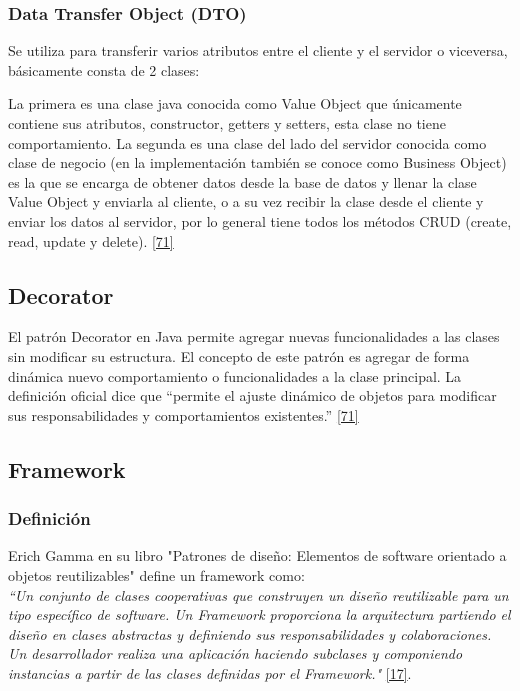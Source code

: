 \subsubsection{Data Transfer Object (DTO)}
Se utiliza para transferir varios atributos entre el cliente y el servidor o viceversa, básicamente consta de 2 clases:

La primera es una clase java conocida como Value Object que únicamente contiene sus atributos, constructor, getters y setters, esta clase no tiene comportamiento.
La segunda es una clase del lado del servidor conocida como clase de negocio (en la implementación también se conoce como Business Object) es la que se encarga de obtener datos desde la base de datos y llenar la clase Value Object y enviarla al cliente, o a su vez recibir la clase desde el cliente y enviar los datos al servidor, por lo general tiene todos los métodos CRUD (create, read, update y delete). \hyperlink{b71}{[71]}

\subsection{Decorator}
El patrón Decorator en Java permite agregar nuevas funcionalidades a las clases sin modificar su estructura.
El concepto de este patrón es agregar de forma dinámica nuevo comportamiento o funcionalidades a la clase principal.
La definición oficial dice que “permite el ajuste dinámico de objetos para modificar sus responsabilidades y comportamientos existentes.”  \hyperlink{b71}{[71]}

\subsection{Framework}

\subsubsection{Definición}

Erich Gamma en su libro "Patrones de diseño: Elementos de software orientado a objetos reutilizables" define un framework como:\\ 

\textit {``Un conjunto de clases cooperativas que construyen un diseño reutilizable para un tipo específico de software. Un Framework proporciona la arquitectura partiendo el diseño en clases abstractas y definiendo sus responsabilidades y colaboraciones. Un desarrollador realiza una aplicación haciendo subclases y componiendo instancias a partir de las clases definidas por el Framework."} \hyperlink{b17}{[17]}. \\

